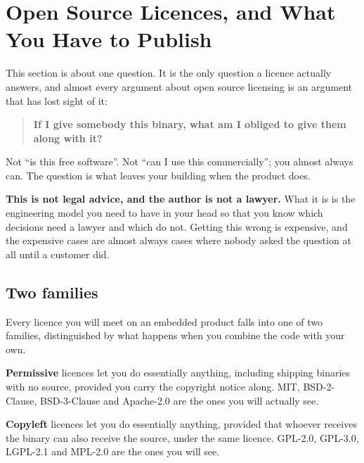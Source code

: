 
\section{Open Source Licences, and What You Have to Publish}
\label{c1:app:b}

This section is about one question. It is the only question a licence actually answers, and almost
every argument about open source licensing is an argument that has lost sight of it:

\begin{quote}
\textbf{If I give somebody this binary, what am I obliged to give them along with it?}
\end{quote}

Not ``is this free software''. Not ``can I use this commercially''; you almost always can. The
question is what leaves your building when the product does.

\textbf{This is not legal advice, and the author is not a lawyer.} What it is is the engineering
model you need to have in your head so that you know which decisions need a lawyer and which do not.
Getting this wrong is expensive, and the expensive cases are almost always cases where nobody asked
the question at all until a customer did.

\subsection{Two families}
\label{c1:app:b1}

Every licence you will meet on an embedded product falls into one of two families, distinguished by
what happens when you combine the code with your own.

\textbf{Permissive} licences let you do essentially anything, including shipping binaries with no
source, provided you carry the copyright notice along. MIT, BSD-2-Clause, BSD-3-Clause and
Apache-2.0 are the ones you will actually see.

\textbf{Copyleft} licences let you do essentially anything, provided that whoever receives the
binary can also receive the source, under the same licence. GPL-2.0, GPL-3.0, LGPL-2.1 and MPL-2.0
are the ones you will see.


